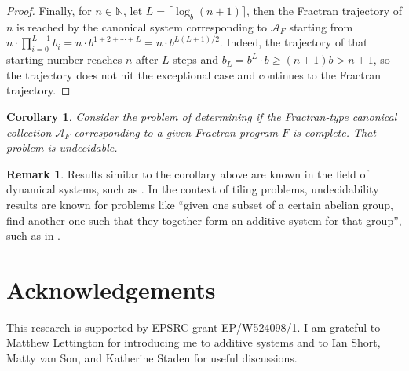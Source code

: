 \documentclass[12pt]{article}
\newtheorem{corollary}{Corollary}
\theoremstyle{definition}
\newtheorem{remark}{Remark}
\newcommand{\N}{\mathbb{N}}
\begin{document}
\begin{proof}
Finally, for $n\in\N$, let $L=\lceil\log_b (n+1)\rceil$, then the Fractran trajectory of $n$ is reached by the canonical system corresponding to $\mathcal{A}_F$ starting from $n\cdot\prod_{i=0}^{L-1}b_i = n\cdot b^{1+2+\dotsb+L} = n\cdot b^{L(L+1)/2}$. Indeed, the trajectory of that starting number reaches $n$ after $L$ steps and $b_L = b^L\cdot b \geqslant (n+1)b > n+1$, so the trajectory does not hit the exceptional case and continues to the Fractran trajectory.
\end{proof}


\begin{corollary}
\label{cor:undecidable}
Consider the problem of determining if the Fractran-type canonical collection $\mathcal{A}_F$ corresponding to a given Fractran program $F$ is complete. That problem is undecidable.
\end{corollary}
\begin{remark}
Results similar to the corollary above are known in the field of dynamical systems, such as \cite{mortality}.
In the context of tiling problems, undecidability results are known for problems like ``given one subset of a certain abelian group, find another one such that they together form an additive system for that group'', such as in \cite{grtao}.
\end{remark}

\section*{Acknowledgements}
This research is supported by EPSRC grant EP/W524098/1.
I am grateful to Matthew Lettington for introducing me to additive systems and to Ian Short, Matty van Son, and Katherine Staden for useful discussions.


\printbibliography
\end{document}
